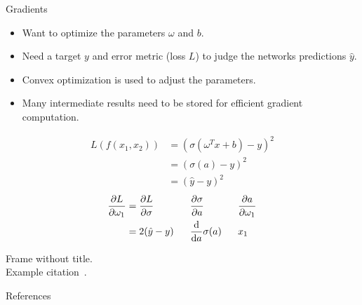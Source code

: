 \documentclass[aspectratio=169]{beamer} %
\begin{document}
\begin{frame}{Gradients}
  \begin{itemize}
    \item Want to optimize the parameters $\omega$ and $b$.
    \item Need a target $y$ and error metric (loss $L$) to judge the networks predictions $\hat y$.
    \item Convex optimization is used to adjust the parameters.
    \item Many intermediate results need to be stored for efficient gradient computation.
  \end{itemize}

  \begin{align*}
    L(f(x_1, x_2)) &= (\sigma(\omega^T x + b) - y) ^2\\
                   &= (\sigma(a) - y) ^ 2\\
                   &= (\hat y - y) ^ 2
  \end{align*}
  \begin{alignat*}{3}
    \pdv{L}{\omega_1} &= \pdv{L}{\sigma} &&\pdv{\sigma}{a}      &&\pdv{a}{\omega_1}\\
                      &= 2(\hat y - y)~~ &&\odv{}{a}\sigma(a)~~ &&x_1
  \end{alignat*}
  
\end{frame}


\begin{frame}
  Frame without title.\\

  Example citation~\cite{Russel2020}.
\end{frame}


\begin{skipframecount}

\begin{frame}[allowframebreaks]{References}
  \printbibliography[heading=none]
\end{frame}

\appendix

\end{skipframecount}
\end{document}
